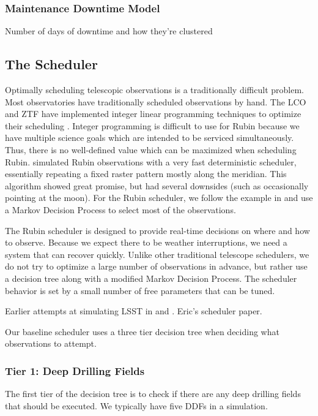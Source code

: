 \subsubsection{Maintenance Downtime Model}

Number of days of downtime and how they're clustered


\subsection{The Scheduler}

Optimally scheduling telescopic observations is a traditionally difficult problem. Most observatories have traditionally scheduled observations by hand. The LCO and ZTF have implemented integer linear programming techniques to optimize their scheduling \citep{Lampoudi15, Bellm19}. Integer programming is difficult to use for Rubin because we have multiple science goals which are intended to be serviced simultaneously. Thus, there is no well-defined value which can be maximized when scheduling Rubin. \citet{Rothchild19} simulated Rubin observations with a very fast deterministic scheduler, essentially repeating a fixed raster pattern mostly along the meridian. This algorithm showed great promise, but had several downsides (such as occasionally pointing at the moon). For the Rubin scheduler, we follow the example in \citet{Naghib19} and use a Markov Decision Process to select most of the observations.

The Rubin scheduler is designed to provide real-time decisions on where and how to observe. Because we expect there to be weather interruptions, we need a system that can recover quickly. Unlike other traditional telescope schedulers, we do not try to optimize a large number of observations in advance, but rather use a decision tree along with a modified Markov Decision Process. The scheduler behavior is set by a small number of free parameters that can be tuned.

Earlier attempts at simulating LSST in \citet{Rothchild19} and \citet{Naghib19}. Eric's scheduler paper. 

Our baseline scheduler uses a three tier decision tree when deciding what observations to attempt. 

\subsubsection{Tier 1:  Deep Drilling Fields}

The first tier of the decision tree is to check if there are any deep drilling fields that should be executed. We typically have five DDFs in a simulation. 

